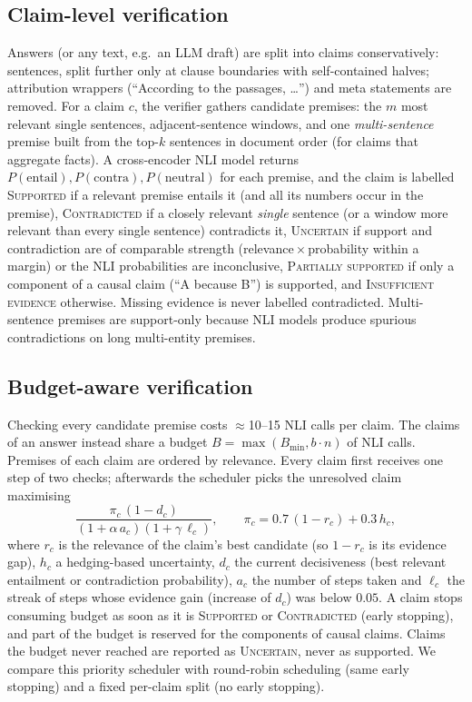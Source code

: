 \subsection{Claim-level verification}
Answers (or any text, e.g.\ an LLM draft) are split into claims conservatively: sentences, split further only at clause boundaries with self-contained halves; attribution wrappers (``According to the passages, \dots'') and meta statements are removed.
For a claim $c$, the verifier gathers candidate premises: the $m$ most relevant single sentences, adjacent-sentence windows, and one \emph{multi-sentence} premise built from the top-$k$ sentences in document order (for claims that aggregate facts).
A cross-encoder NLI model \citep{he2023debertav3} returns $P(\text{entail}), P(\text{contra}), P(\text{neutral})$ for each premise, and the claim is labelled
\textsc{Supported} if a relevant premise entails it (and all its numbers occur in the premise),
\textsc{Contradicted} if a closely relevant \emph{single} sentence (or a window more relevant than every single sentence) contradicts it,
\textsc{Uncertain} if support and contradiction are of comparable strength (relevance\,$\times$\,probability within a margin) or the NLI probabilities are inconclusive,
\textsc{Partially supported} if only a component of a causal claim (``A because B'') is supported,
and \textsc{Insufficient evidence} otherwise.
Missing evidence is never labelled contradicted.
Multi-sentence premises are support-only because NLI models produce spurious contradictions on long multi-entity premises.

\subsection{Budget-aware verification}
Checking every candidate premise costs $\approx$10--15 NLI calls per claim.
The claims of an answer instead share a budget $B = \max(B_{\min}, b\cdot n)$ of NLI calls.
Premises of each claim are ordered by relevance.
Every claim first receives one step of two checks; afterwards the scheduler picks the unresolved claim maximising
\begin{equation}
  \frac{\pi_c\,(1-d_c)}{(1+\alpha\,a_c)(1+\gamma\,\ell_c)},\qquad
  \pi_c = 0.7\,(1-r_c) + 0.3\,h_c,
\end{equation}
where $r_c$ is the relevance of the claim's best candidate (so $1-r_c$ is its evidence gap), $h_c$ a hedging-based uncertainty, $d_c$ the current decisiveness (best relevant entailment or contradiction probability), $a_c$ the number of steps taken and $\ell_c$ the streak of steps whose evidence gain (increase of $d_c$) was below $0.05$.
A claim stops consuming budget as soon as it is \textsc{Supported} or \textsc{Contradicted} (early stopping), and part of the budget is reserved for the components of causal claims.
Claims the budget never reached are reported as \textsc{Uncertain}, never as supported.
We compare this priority scheduler with round-robin scheduling (same early stopping) and a fixed per-claim split (no early stopping).

